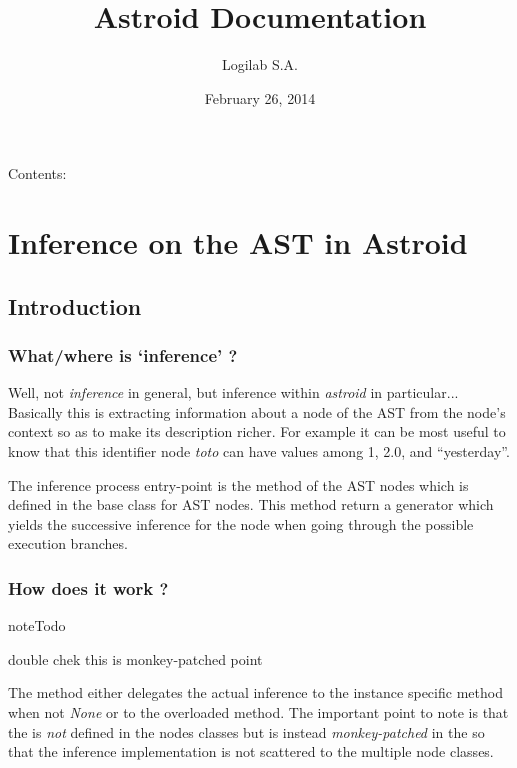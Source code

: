 \documentclass[letterpaper,10pt,english]{sphinxmanual}
\title{Astroid Documentation}
\date{February 26, 2014}
\author{Logilab S.A.}
\begin{document}
\maketitle
\tableofcontents
{}\label{index::doc}


Contents:


\chapter{Inference on the AST in Astroid}
\label{inference:welcome-to-astroid-s-documentation}\label{inference:inference}\label{inference::doc}\label{inference:inference-on-the-ast-in-astroid}

\section{Introduction}
\label{inference:introduction}

\subsection{What/where is `inference' ?}
\label{inference:what-where-is-inference}
Well, not \emph{inference} in general, but inference within \emph{astroid} in
particular... Basically this is extracting information about a node of
the AST from the node's context so as to make its description
richer. For example it can be most useful to know that this
identifier node \emph{toto} can have values among 1, 2.0, and ``yesterday''.

The inference process entry-point is the  method
of the AST nodes which is defined in  the base class
for AST nodes. This method return a generator which yields the
successive inference for the node when going through the possible
execution branches.


\subsection{How does it work ?}
\label{inference:how-does-it-work}
\begin{notice}{note}{Todo}

double chek this  is monkey-patched point
\end{notice}

The  method either delegates the actual inference
to the instance specific method 
when not \emph{None} or to the overloaded  method. The
important point to note is that the  is \emph{not} defined in
the nodes classes but is instead \emph{monkey-patched} in the
 so that the inference implementation is not
scattered to the multiple node classes.
\end{document}
